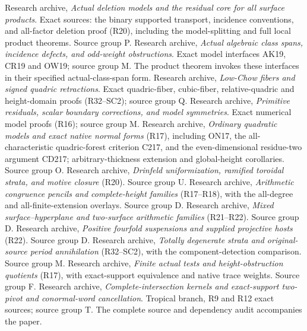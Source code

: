  Research archive,
\emph{Actual deletion models and the residual core for all surface
products}. Exact sources: the binary supported transport, incidence
conventions, and all-factor deletion proof (R20), including the
model-splitting and full local product theorems. Source group P.
 Research archive,
\emph{Actual algebraic class spans, incidence defects, and odd-weight
obstructions}. Exact model interfaces AK19, CR19 and OW19;
source group M. The product theorem invokes these interfaces in
their specified actual-class-span form.
 Research archive,
\emph{Low-Chow fibers and signed quadric retractions}. Exact
quadric-fiber, cubic-fiber, relative-quadric and height-domain
proofs (R32--SC2); source group Q.
 Research archive,
\emph{Primitive residuals, scalar boundary corrections, and model
symmetries}. Exact numerical model proofs (R16); source group M.
 Research archive,
\emph{Ordinary quadratic models and exact native normal forms}
(R17), including ON17, the all-characteristic quadric-forest criterion
C217, and the even-dimensional residue-two argument CD217;
arbitrary-thickness extension and global-height
corollaries. Source group O.
 Research archive,
\emph{Drinfeld uniformization, ramified toroidal strata, and motive
closure} (R20). Source group U.
 Research archive,
\emph{Arithmetic congruence pencils and complete-height families}
(R17--R18), with the all-degree and all-finite-extension overlays.
Source group D.
 Research archive,
\emph{Mixed surface--hyperplane and two-surface arithmetic
families} (R21--R22). Source group D.
 Research archive,
\emph{Positive fourfold suspensions and supplied projective hosts}
(R22). Source group D.
 Research archive,
\emph{Totally degenerate strata and original-source period
annihilation} (R32--SC2), with the component-detection comparison.
Source group M.
 Research archive,
\emph{Finite actual tests and height-obstruction quotients}
(R17), with exact-support equivalence and native trace weights.
Source group F.
 Research archive,
\emph{Complete-intersection kernels and exact-support
two-pivot and conormal-word cancellation}. Tropical branch,
R9 and R12 exact sources; source group T. The complete source
and dependency audit accompanies the paper.
